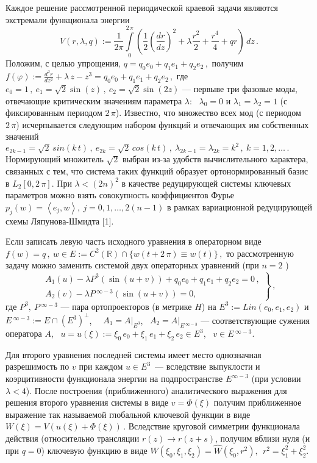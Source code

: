 Каждое решение рассмотренной периодической краевой задачи являются
экстремали функционала энергии
 $$
V (r, \lambda, q):= \frac1{2\pi}\int\limits_0^{2\,\pi}
\left(\frac12\left(\frac{dr}{dz}\right)^2  +   \lambda  \frac{r^2}2
+ \frac{r^4}4 + qr\right)\,dz\,.
 $$
Положим, с целью упрощения,  $q = q_0e_0 + q_1e_1 + q_2e_2\,,$
получим
 $
f(\varphi):=\frac{d^2 r}{dz^2} + \lambda\,z - z^3 = q_0e_0 + q_1e_1
+ q_2e_2\,,
 $
где $ e_0 = 1\,, \  e_1=\sqrt {2}\sin(z)\,, \  e_2=\sqrt
{2}\sin(2z)$
--- первыве три фазовые моды, отвечающие критическим значениям
параметра $\lambda$: \ $\lambda_0=0$  и $\lambda_1=\lambda_2=1$ (с
фиксированным периодом $2\,\pi$). Известно, что множество всех мод
(с периодом $2\,\pi$) исчерпывается следующим набором функций и
отвечающих им собственных значений
 $
e_{2k-1} = \sqrt2\,sin(k\,t)\,,  \ e_{2k} = \sqrt2\,cos(k\,t)\,, \
\lambda_{2k-1} = \lambda_{2k} = k^2\,, \ k=1,2,\dots \,.
 $
Нормирующий множитель $\sqrt2$ выбран из-за удобств вычислительного
характера, связанных с тем, что система таких функций образует
ортонормированный базис в $L_2[0,2\,\pi]$. При $\lambda<(2n)^2$ в
качестве редуцирующей системы ключевых параметров можно взять
совокупность коэффициентов Фурье
 $
p_j(w)=\left<e_j,w\right>,\ j=0,1,\ldots,2(n-1)
 $
в рамках вариационной редуцирующей схемы Ляпунова-Шмидта [1].

Если записать левую часть исходного уравнения в операторном виде
 $
f (w) =q\,, \  w\in E:=C^2(\mathbb{R})\cap\{w(t+2\,\pi)\equiv
w(t)\}\,,
 $
то рассмотренную задачу можно заменить системой двух операторных
уравнений (при $n=2$ )
 $$
 \left.
\begin{array}{l}
A_1 \left( u \right) - \lambda P^3 \left(\sin( u+v) \right)
+q_0e_0+q_1e_1+q_2e_2 = 0\,,
\\
A_2( v ) - \lambda P\,^{\infty-3}
 \left( \sin(u+v)\right) =0,
\end{array}\right\}\,,
  $$
где $P^3,\ P\,^{\infty-3}$ --- пара ортопроекторов (в метрике $H$)
на $E^3:=Lin(e_0,e_1,e_2)$ и
$E\,^{\infty-3}:=E\cap\left(E^3\right)^\perp$, \ \ $A_1 =
A\vert_{E^3}$, \ $A_2 = A\vert_{E\,^{\infty-3}}$ --- соответствующие
сужения оператора $A$, \ $u = u(\xi):=\xi_0\,e_0 + \xi_1\,e_1 +
\xi_2\,e_2 \in E^3$, \ $v\in E\,^{\infty-3}$.

Для второго уравнения последней системы имеет место однозначная
разре\-ши\-мость по $v$ при каждом $u\in E^3$~--- всле\-д\-с\-т\-вие
выпуклости и коэрцитивности функционала энергии на подпространстве
$E^{\infty-3}$ (при условии $\lambda<4$). После построения
(приближенного) аналитического выражения для решения второго
уравнения системы  в виде $v=\Phi(\xi)$ получим приближенное
выражение так называемой глобальной ключевой функции в виде
 $
W(\xi)=V\left(u(\xi)+\Phi(\xi)\right)\,.
 $
Вследствие круговой симметрии функционала действия (относительно
трансляции  $r(z) \longrightarrow r(z+s)$, получим вблизи нуля (и при
$ q=0$) ключевую функцию в виде
 $
W(\xi_0,\xi_1,\xi_2) = \widehat{W}(\xi_0,r^2), \ \
r^2=\xi_1^2+\xi_2^2.
 $


